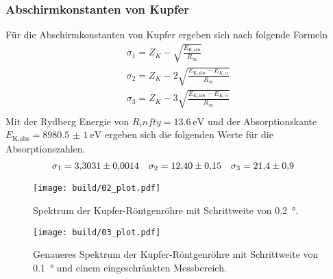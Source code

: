 \subsubsection{Abschirmkonstanten von Kupfer}
Für die Abschirmkonstanten von Kupfer ergeben sich nach \cite{man:v602} folgende Formeln
\begin{align}
    \sigma_1 = Z_K -\sqrt{\frac{E_\text{K,abs}}{R_\infty}}\\
    \sigma_2 = Z_K -2\sqrt{\frac{E_\text{K,abs}- E_{K,\alpha} }{R_\infty}}\\
    \sigma_3 = Z_K -3\sqrt{\frac{E_\text{K,abs}- E_{K,\alpha} }{R_\infty}}\\
\end{align}
Mit der Rydberg Energie von $R_infty = \qty{13.6}{\eV}$ und der Absorptionskante $E_\text{K,abs} = \qty{8980.5(10)}{\eV}$ \cite{x-ray}
ergeben sich die folgenden Werte für die Absorptionszahlen.
\begin{align}
    \sigma_1 &= \num{3.3031 \pm 0.0014} &
    \sigma_2 &= \num{12.40 \pm 0.15} &
    \sigma_3 &= \num{21.4 \pm 0.9}
\end{align}



\begin{figure}
    \centering
    \texttt{[image: build/02\_plot.pdf]}
    \caption{Spektrum der Kupfer-Röntgenröhre mit Schrittweite von \qty{0.2}{\degree}.}
    \label{fig:02}
\end{figure}
\begin{figure}
    \centering
    \texttt{[image: build/03\_plot.pdf]}
    \caption{Genaueres Spektrum der Kupfer-Röntgenröhre mit Schrittweite von \qty{0.1}{\degree} und einem eingeschränkten Messbereich.}
    \label{fig:03}
\end{figure}




